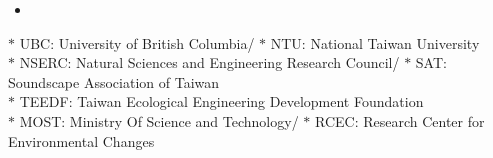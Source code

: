 \documentclass[11pt,letterpaper,sans]{moderncv}        %
\begin{document}
\begin{itemize}
\item{}
\end{itemize}

$\ast$ UBC: University of British Columbia/ $\ast$ NTU: National Taiwan University \\
$\ast$ NSERC: Natural Sciences and Engineering Research Council/ $\ast$ SAT: Soundscape Association of Taiwan\\
$\ast$ TEEDF: Taiwan Ecological Engineering Development Foundation\\
$\ast$ MOST: Ministry Of Science and Technology/ $\ast$ RCEC: Research Center for Environmental Changes



\end{document}
